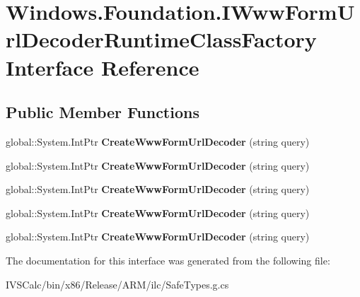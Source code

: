 \hypertarget{interface_windows_1_1_foundation_1_1_i_www_form_url_decoder_runtime_class_factory}{}\section{Windows.\+Foundation.\+I\+Www\+Form\+Url\+Decoder\+Runtime\+Class\+Factory Interface Reference}
\label{interface_windows_1_1_foundation_1_1_i_www_form_url_decoder_runtime_class_factory}
\subsection*{Public Member Functions}
\begin{DoxyCompactItemize}
\item 
\mbox{\label{interface_windows_1_1_foundation_1_1_i_www_form_url_decoder_runtime_class_factory_a8888f1b7d336ec4edd408d6a6f5d9b2a}} 
global\+::\+System.\+Int\+Ptr {\bfseries Create\+Www\+Form\+Url\+Decoder} (string query)
\item 
\mbox{\label{interface_windows_1_1_foundation_1_1_i_www_form_url_decoder_runtime_class_factory_a8888f1b7d336ec4edd408d6a6f5d9b2a}} 
global\+::\+System.\+Int\+Ptr {\bfseries Create\+Www\+Form\+Url\+Decoder} (string query)
\item 
\mbox{\label{interface_windows_1_1_foundation_1_1_i_www_form_url_decoder_runtime_class_factory_a8888f1b7d336ec4edd408d6a6f5d9b2a}} 
global\+::\+System.\+Int\+Ptr {\bfseries Create\+Www\+Form\+Url\+Decoder} (string query)
\item 
\mbox{\label{interface_windows_1_1_foundation_1_1_i_www_form_url_decoder_runtime_class_factory_a8888f1b7d336ec4edd408d6a6f5d9b2a}} 
global\+::\+System.\+Int\+Ptr {\bfseries Create\+Www\+Form\+Url\+Decoder} (string query)
\item 
\mbox{\label{interface_windows_1_1_foundation_1_1_i_www_form_url_decoder_runtime_class_factory_a8888f1b7d336ec4edd408d6a6f5d9b2a}} 
global\+::\+System.\+Int\+Ptr {\bfseries Create\+Www\+Form\+Url\+Decoder} (string query)
\end{DoxyCompactItemize}


The documentation for this interface was generated from the following file\+:\begin{DoxyCompactItemize}
\item 
I\+V\+S\+Calc/bin/x86/\+Release/\+A\+R\+M/ilc/Safe\+Types.\+g.\+cs\end{DoxyCompactItemize}
